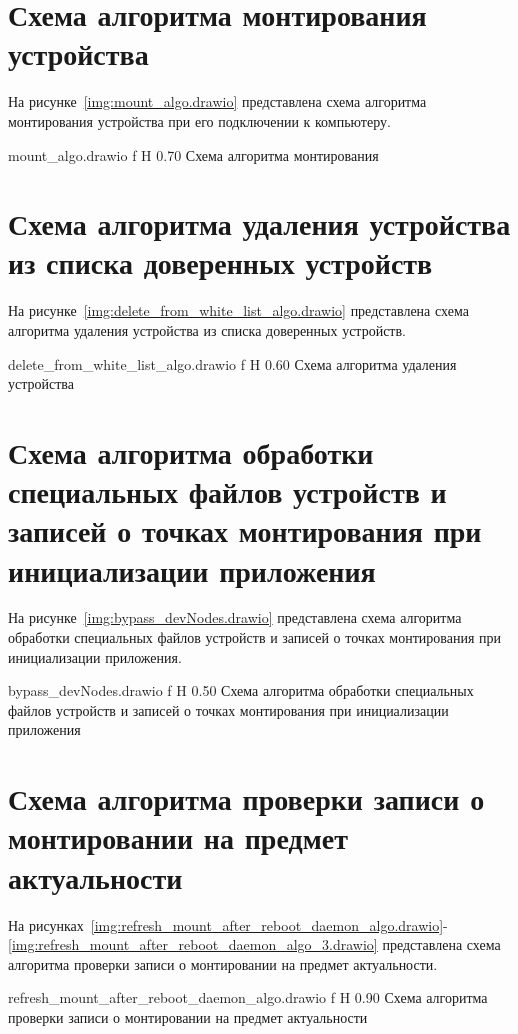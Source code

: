 \section{Схема алгоритма монтирования устройства}

На рисунке~\ref{img:mount_algo.drawio} представлена схема алгоритма монтирования устройства
при его подключении к компьютеру.

    {mount_algo.drawio}
    {f}
    {H}
    {0.70\textwidth}
    {Схема алгоритма монтирования}

\section{Схема алгоритма удаления устройства из списка доверенных устройств}

На рисунке~\ref{img:delete_from_white_list_algo.drawio} представлена схема алгоритма 
удаления устройства из списка доверенных устройств.

    {delete_from_white_list_algo.drawio}
    {f}
    {H}
    {0.60\textwidth}
    {Схема алгоритма удаления устройства}

\section{Схема алгоритма обработки специальных файлов устройств и записей о точках монтирования при инициализации приложения}

На рисунке~\ref{img:bypass_devNodes.drawio} представлена схема алгоритма 
обработки специальных файлов устройств и записей о точках монтирования при инициализации приложения.

    {bypass_devNodes.drawio}
    {f}
    {H}
    {0.50\textwidth}
    {Схема алгоритма обработки специальных файлов устройств и записей о точках монтирования при инициализации приложения}

\section{Схема алгоритма проверки записи о монтировании на предмет актуальности}

На рисунках~\ref{img:refresh_mount_after_reboot_daemon_algo.drawio}-\ref{img:refresh_mount_after_reboot_daemon_algo_3.drawio} представлена схема алгоритма 
проверки записи о монтировании на предмет актуальности.

    {refresh_mount_after_reboot_daemon_algo.drawio}
    {f}
    {H}
    {0.90\textwidth}
    {Схема алгоритма проверки записи о монтировании на предмет актуальности}


